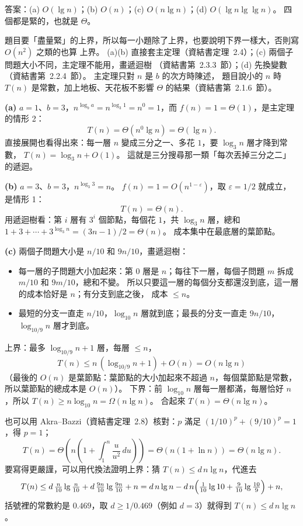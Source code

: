 \begin{pastsoln}
答案：(a) $O(\lg n)$；(b) $O(n)$；(c) $O(n \lg n)$；(d) $O(\lg n \lg\lg n)$。 四個都是緊的，也就是
$\Theta$。

題目要「盡量緊」的上界，所以每一小題除了上界，也要說明下界一樣大，否則寫 $O(n^2)$ 之類的也算
上界。 (a)(b) 直接套主定理（資結書定理~2.4）；(c) 兩個子問題大小不同，主定理不能用，畫遞迴樹
（資結書第~2.3.3~節）；(d) 先換變數（資結書第~2.2.4~節）。 主定理只對 $n$ 是 $b$ 的次方時陳述，
題目說小的 $n$ 時 $T(n)$ 是常數，加上地板、天花板不影響 $\Theta$ 的結果（資結書第~2.1.6~節）。

\textbf{(a)} $a = 1$、$b = 3$，$n^{\log_b a} = n^{\log_3 1} = n^0 = 1$，而 $f(n) = 1 = \Theta(1)$，是主定理
的情形 2：
\[
T(n) = \Theta(n^{0} \lg n) = \Theta(\lg n).
\]
直接展開也看得出來：每一層 $n$ 變成三分之一、多花 $1$，要 $\log_3 n$ 層才降到常數，
$T(n) = \log_3 n + O(1)$。 這就是三分搜尋那一類「每次丟掉三分之二」的遞迴。

\textbf{(b)} $a = 3$、$b = 3$，$n^{\log_3 3} = n$。 $f(n) = 1 = O(n^{1 - \varepsilon})$，取
$\varepsilon = 1/2$ 就成立，是情形 1：
\[
T(n) = \Theta(n).
\]
用遞迴樹看：第 $i$ 層有 $3^i$ 個節點，每個花 $1$，共 $\log_3 n$ 層，總和
$1 + 3 + \cdots + 3^{\log_3 n} = (3n - 1)/2 = \Theta(n)$。 成本集中在最底層的葉節點。

\textbf{(c)} 兩個子問題大小是 $n/10$ 和 $9n/10$，畫遞迴樹：
\begin{itemize}
\item 每一層的子問題大小加起來：第 $0$ 層是 $n$；每往下一層，每個子問題 $m$ 拆成 $m/10$ 和
$9m/10$，總和不變。 所以只要這一層的每個分支都還沒到底，這一層的成本恰好是 $n$；有分支到底之後，
成本 $\le n$。
\item 最短的分支一直走 $n/10$，$\log_{10} n$ 層就到底；最長的分支一直走 $9n/10$，
$\log_{10/9} n$ 層才到底。
\end{itemize}
上界：最多 $\log_{10/9} n + 1$ 層，每層 $\le n$，
\[
T(n) \le n\,(\log_{10/9} n + 1) + O(n) = O(n \lg n)
\]
（最後的 $O(n)$ 是葉節點：葉節點的大小加起來不超過 $n$，每個葉節點是常數，所以葉節點的總成本是
$O(n)$）。 下界：前 $\log_{10} n$ 層每一層都滿，每層恰好 $n$，所以 $T(n) \ge n \log_{10} n =
\Omega(n \lg n)$。 合起來 $T(n) = \Theta(n \lg n)$。

也可以用 Akra--Bazzi（資結書定理~2.8）核對：$p$ 滿足 $(1/10)^p + (9/10)^p = 1$，得 $p = 1$；
\[
T(n) = \Theta\!\left(n\left(1 + \int_1^n \frac{u}{u^2}\,du\right)\right) = \Theta(n(1 + \ln n)) =
\Theta(n \lg n).
\]
要寫得更嚴謹，可以用代換法證明上界：猜 $T(n) \le d\, n \lg n$，代進去
\[
T(n) \le d\,\tfrac{n}{10}\lg\tfrac{n}{10} + d\,\tfrac{9n}{10}\lg\tfrac{9n}{10} + n
= d\,n\lg n - d\,n\Bigl(\tfrac{1}{10}\lg 10 + \tfrac{9}{10}\lg\tfrac{10}{9}\Bigr) + n ,
\]
括號裡的常數約是 $0.469$，取 $d \ge 1/0.469$（例如 $d = 3$）就得到 $T(n) \le d\,n\lg n$。


\end{pastsoln}
